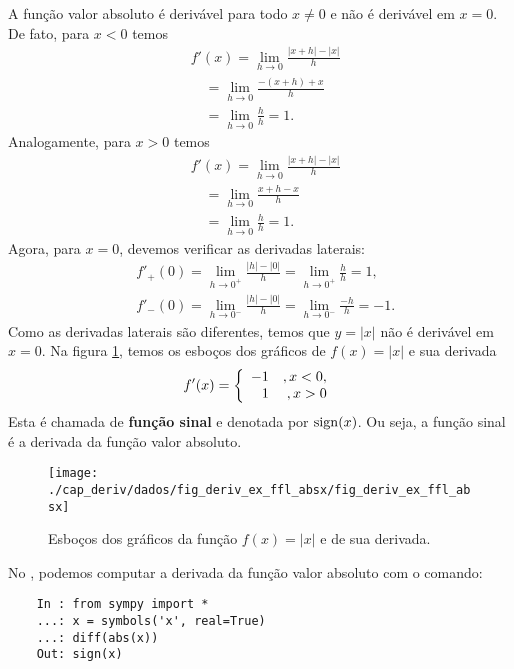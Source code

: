 \begin{ex}\label{ex:deriv_dabs}
  A função valor absoluto é derivável para todo $x\neq 0$ e não é derivável em $x=0$. De fato, para $x<0$ temos
  \begin{align}
    & f'(x) = \lim_{h\to 0} \frac{|x+h|-|x|}{h}\\
    & \text{}\quad = \lim_{h\to 0} \frac{-(x+h)+x}{h}\\
    & \text{}\quad = \lim_{h\to 0} \frac{h}{h} = 1.
  \end{align}
  Analogamente, para $x>0$ temos
  \begin{align}
    & f'(x) = \lim_{h\to 0} \frac{|x+h|-|x|}{h}\\
    & \text{}\quad = \lim_{h\to 0} \frac{x+h-x}{h}\\
    & \text{}\quad = \lim_{h\to 0} \frac{h}{h} = 1.
  \end{align}
  Agora, para $x=0$, devemos verificar as derivadas laterais:
  \begin{align}
    & f'_+(0) = \lim_{h\to 0^+} \frac{|h|-|0|}{h} = \lim_{h\to 0^+} \frac{h}{h} = 1,\\
    & f'_-(0) = \lim_{h\to 0^-} \frac{|h|-|0|}{h} = \lim_{h\to 0^-} \frac{-h}{h} = -1.
  \end{align}
  Como as derivadas laterais são diferentes, temos que $y = |x|$ não é derivável em $x=0$. Na figura \ref{fig:deriv_ex_ffl_absx}, temos os esboços dos gráficos de $f(x) = |x|$ e sua derivada
  \begin{equation}\label{eq:deriv_signx}
    f'(x) = \left\{
      \begin{array}[H]{rr}
        -1 &, x<0,\\
        1 &, x> 0
      \end{array}
    \right.
  \end{equation}
  Esta é chamada de {\bf função sinal} e denotada por $\operatorname{sign}(x)$. Ou seja, a função sinal é a derivada da função valor absoluto.

  \begin{figure}[H]
    \centering
    \texttt{[image: ./cap\_deriv/dados/fig\_deriv\_ex\_ffl\_absx/fig\_deriv\_ex\_ffl\_absx]}
    \caption{Esboços dos gráficos da função $f(x)=|x|$ e de sua derivada.}
    \label{fig:deriv_ex_ffl_absx}
  \end{figure}

  \ifispython
  No \sympy, podemos computar a derivada da função valor absoluto com o comando:
  \begin{lstlisting}
    In : from sympy import *
    ...: x = symbols('x', real=True)
    ...: diff(abs(x))
    Out: sign(x)
  \end{lstlisting}
  \fi
\end{ex}


